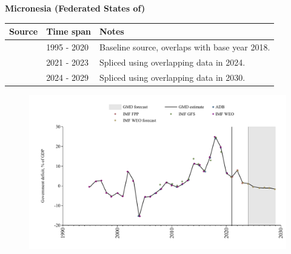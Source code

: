 \documentclass[12pt,a4paper,landscape]{article}
\begin{document}
\begin{adjustbox}{max totalsize={\paperwidth}{\paperheight},center}
\begin{minipage}[t][\textheight][t]{\textwidth}
\vspace*{0.5cm}
{}
\begin{center}
{\Large\bfseries Micronesia (Federated States of)}
\end{center}
\vspace{0.5cm}
\begin{table}[H]
\centering
\small
\begin{tabular}{|l|l|l|}
\hline
\textbf{Source} & \textbf{Time span} & \textbf{Notes} \\
\hline
\rowcolor{white}\cite{IMF_WEO}& 1995 - 2020 &Baseline source, overlaps with base year 2018.\\
\rowcolor{lightgray}\cite{IMF_FPP}& 2021 - 2023 &Spliced using overlapping data in 2024.\\
\rowcolor{white}\cite{IMF_WEO_forecast}& 2024 - 2029 &Spliced using overlapping data in 2030.\\
\hline
\end{tabular}
\end{table}
\begin{figure}[H]
\centering
\includegraphics[width=\textwidth,height=0.6\textheight,keepaspectratio]{graphs/FSM_govdef_GDP.pdf}
\end{figure}
\end{minipage}
\end{adjustbox}
\end{document}
